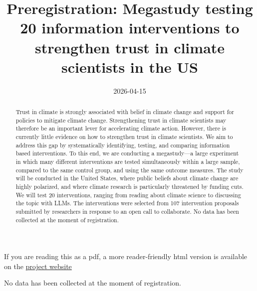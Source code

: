 \documentclass[
  letterpaper,
  DIV=11,
  numbers=noendperiod]{scrartcl}
\title{Preregistration: Megastudy testing 20 information interventions
to strengthen trust in climate scientists in the US}
\author{}
\date{2026-04-15}
\renewcommand*\contentsname{Table of contents}
\newcommand\contentsname{Table of contents}
\begin{document}
\maketitle
\begin{abstract}
Trust in climate is strongly associated with belief in climate change
and support for policies to mitigate climate change. Strengthening trust
in climate scientists may therefore be an important lever for
accelerating climate action. However, there is currently little evidence
on how to strengthen trust in climate scientists. We aim to address this
gap by systematically identifying, testing, and comparing information
based interventions. To this end, we are conducting a megastudy---a
large experiment in which many different interventions are tested
simultaneously within a large sample, compared to the same control
group, and using the same outcome measures. The study will be conducted
in the United States, where public beliefs about climate change are
highly polarized, and where climate research is particularly threatened
by funding cuts. We will test 20 interventions, ranging from reading
about climate science to discussing the topic with LLMs. The
interventions were selected from 107 intervention proposals submitted by
researchers in response to an open call to collaborate. No data has been
collected at the moment of registration.
\end{abstract}

\clearpage

\renewcommand*\contentsname{Table of contents}
{
\hypersetup{linkcolor=}
\setcounter{tocdepth}{5}
\tableofcontents
}

\begin{tcolorbox}[enhanced jigsaw, rightrule=.15mm, colback=white, left=2mm, coltitle=black, breakable, toprule=.15mm, bottomtitle=1mm, titlerule=0mm, title=\textcolor{quarto-callout-note-color}{\faInfo}\hspace{0.5em}{Note}, arc=.35mm, toptitle=1mm, colbacktitle=quarto-callout-note-color!10!white, bottomrule=.15mm, opacityback=0, opacitybacktitle=0.6, colframe=quarto-callout-note-color-frame, leftrule=.75mm]

If you are reading this as a pdf, a more reader-friendly html version is
available on the
\href{https://janpfander.github.io/trust_climate_scientists/}{project
website}

No data has been collected at the moment of registration.

\end{tcolorbox}
\end{document}
